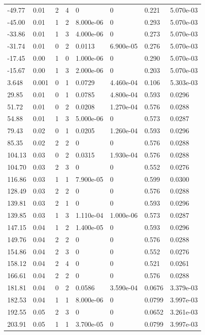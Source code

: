 \documentclass[preview]{standalone}
\begin{document}
{{\begin{tabular}{L{1.2cm}C{1.2cm} C{0.3cm}C{0.5cm} C{1.4cm}C{1.4cm} C{1.4cm}C{1.4cm}}
  -49.77  &  0.01  & 2     &  4 &  0  & 0  & 0.221 &  5.070e-03   \\ 
  -45.00  &  0.01  & 1     &  2 &  8.000e-06  & 0  & 0.293 &  5.070e-03   \\ 
  -33.86  &  0.01  & 1     &  3 &  4.000e-06  & 0  & 0.273 &  5.070e-03   \\ 
  -31.74  &  0.01  & 0     &  2 &  0.0113  & 6.900e-05  & 0.276 &  5.070e-03   \\ 
  -17.45  &  0.00  & 1     &  0 &  1.000e-06  & 0  & 0.290 &  5.070e-03   \\ 
  -15.67  &  0.00  & 1     &  3 &  2.000e-06  & 0  & 0.203 &  5.070e-03   \\ 
  3.648  &  0.001  & 0     &  1 &  0.0729  & 4.460e-04  & 0.106 &  5.303e-03   \\ 
  29.85  &  0.01  & 0     &  1 &  0.0785  & 4.800e-04  & 0.593 &  0.0296   \\ 
  51.72  &  0.01  & 0     &  2 &  0.0208  & 1.270e-04  & 0.576 &  0.0288   \\ 
  54.88  &  0.01  & 1     &  3 &  5.000e-06  & 0  & 0.573 &  0.0287   \\ 
  79.43  &  0.02  & 0     &  1 &  0.0205  & 1.260e-04  & 0.593 &  0.0296   \\ 
  85.35  &  0.02  & 2     &  2 &  0  & 0  & 0.576 &  0.0288   \\ 
  104.13  &  0.03  & 0     &  2 &  0.0315  & 1.930e-04  & 0.576 &  0.0288   \\ 
  104.70  &  0.03  & 2     &  3 &  0  & 0  & 0.552 &  0.0276   \\ 
  116.86  &  0.03  & 1     &  1 &  7.900e-05  & 0  & 0.599 &  0.0300   \\ 
  128.49  &  0.03  & 2     &  2 &  0  & 0  & 0.576 &  0.0288   \\ 
  139.81  &  0.03  & 2     &  1 &  0  & 0  & 0.593 &  0.0296   \\ 
  139.85  &  0.03  & 1     &  3 &  1.110e-04  & 1.000e-06  & 0.573 &  0.0287   \\ 
  147.15  &  0.04  & 1     &  2 &  1.400e-05  & 0  & 0.593 &  0.0296   \\ 
  149.76  &  0.04  & 2     &  2 &  0  & 0  & 0.576 &  0.0288   \\ 
  154.86  &  0.04  & 2     &  3 &  0  & 0  & 0.552 &  0.0276   \\ 
  158.12  &  0.04  & 2     &  4 &  0  & 0  & 0.521 &  0.0261   \\ 
  166.61  &  0.04  & 2     &  2 &  0  & 0  & 0.576 &  0.0288   \\ 
  181.81  &  0.04  & 0     &  2 &  0.0586  & 3.590e-04  & 0.0676 &  3.379e-03   \\ 
  182.53  &  0.04  & 1     &  1 &  8.000e-06  & 0  & 0.0799 &  3.997e-03   \\ 
  192.55  &  0.05  & 2     &  3 &  0  & 0  & 0.0652 &  3.261e-03   \\ 
  203.91  &  0.05  & 1     &  1 &  3.700e-05  & 0  & 0.0799 &  3.997e-03   \\ 
\hline 
\end{tabular} 

}}
\end{document}
